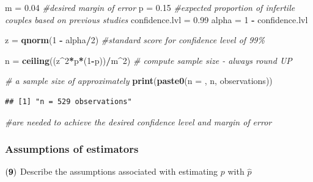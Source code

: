 \documentclass[
]{article}
\newenvironment{Shaded}{\begin{snugshade}}{\end{snugshade}}
\newcommand{\CommentTok}[1]{\textcolor[rgb]{0.56,0.35,0.01}{\textit{#1}}}
\newcommand{\DecValTok}[1]{\textcolor[rgb]{0.00,0.00,0.81}{#1}}
\newcommand{\FloatTok}[1]{\textcolor[rgb]{0.00,0.00,0.81}{#1}}
\newcommand{\FunctionTok}[1]{\textcolor[rgb]{0.13,0.29,0.53}{\textbf{#1}}}
\newcommand{\NormalTok}[1]{#1}
\newcommand{\OtherTok}[1]{\textcolor[rgb]{0.56,0.35,0.01}{#1}}
\newcommand{\SpecialCharTok}[1]{\textcolor[rgb]{0.81,0.36,0.00}{\textbf{#1}}}
\newcommand{\StringTok}[1]{\textcolor[rgb]{0.31,0.60,0.02}{#1}}
\begin{document}
\begin{Shaded}
\begin{Highlighting}[]
\NormalTok{m }\OtherTok{=} \FloatTok{0.04} \CommentTok{\#desired margin of error}
\NormalTok{p }\OtherTok{=} \FloatTok{0.15} \CommentTok{\#expected proportion of infertile couples based on previous studies}
\NormalTok{confidence.lvl }\OtherTok{=} \FloatTok{0.99}
\NormalTok{alpha }\OtherTok{=} \DecValTok{1} \SpecialCharTok{{-}}\NormalTok{ confidence.lvl}

\NormalTok{z }\OtherTok{=} \FunctionTok{qnorm}\NormalTok{(}\DecValTok{1} \SpecialCharTok{{-}}\NormalTok{ alpha}\SpecialCharTok{/}\DecValTok{2}\NormalTok{) }\CommentTok{\#standard score for confidence level of 99\%}

\NormalTok{n }\OtherTok{=} \FunctionTok{ceiling}\NormalTok{((z}\SpecialCharTok{\^{}}\DecValTok{2}\SpecialCharTok{*}\NormalTok{p}\SpecialCharTok{*}\NormalTok{(}\DecValTok{1}\SpecialCharTok{{-}}\NormalTok{p))}\SpecialCharTok{/}\NormalTok{m}\SpecialCharTok{\^{}}\DecValTok{2}\NormalTok{) }\CommentTok{\# compute sample size {-} always round UP}

\CommentTok{\# a sample size of approximately}
\FunctionTok{print}\NormalTok{(}\FunctionTok{paste0}\NormalTok{(}\StringTok{\textquotesingle{}n = \textquotesingle{}}\NormalTok{, n, }\StringTok{\textquotesingle{} observations\textquotesingle{}}\NormalTok{))}
\end{Highlighting}
\end{Shaded}

\begin{verbatim}
## [1] "n = 529 observations"
\end{verbatim}

\begin{Shaded}
\begin{Highlighting}[]
\CommentTok{\#are needed to achieve the desired confidence level and margin of error}
\end{Highlighting}
\end{Shaded}

\subsubsection{Assumptions of
estimators}\label{assumptions-of-estimators}

\(\bf (9)\) Describe the assumptions associated with estimating \(p\)
with \(\hat{p}\)
\end{document}
